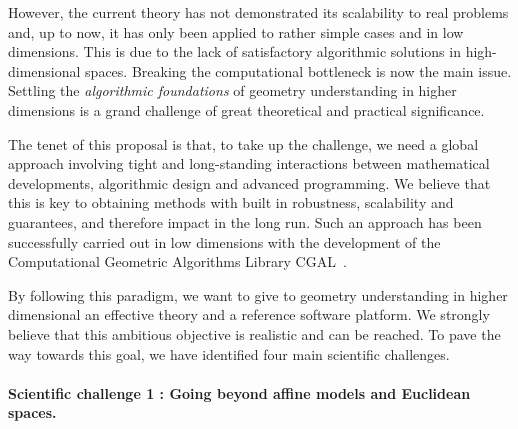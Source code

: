 

However, the current theory has not demonstrated its scalability to real problems and, up to now, it has only been applied to rather simple cases and in low dimensions. This is  due to the lack of satisfactory algorithmic solutions in high-dimensional spaces.
Breaking the computational bottleneck is now the main issue.  Settling the {\em algorithmic foundations} of geometry understanding in
higher dimensions
is a grand challenge of great theoretical and practical significance.


The tenet of this proposal is that, to take up the challenge, we need a global approach involving
tight and long-standing interactions between mathematical developments, algorithmic design and advanced programming. We believe that this is key to obtaining methods with built in
robustness, scalability and guarantees, and therefore  impact in the long run.
Such an approach has been successfully carried out in low dimensions with the 
development of the Computational Geometric Algorithms Library CGAL~\cite{cgal}. 

By following this paradigm, we want  to give to  geometry understanding in higher dimensional an effective theory and a reference software platform. 
We strongly believe that this ambitious objective is realistic and can be reached. To pave the way towards this goal, we have identified  four main scientific challenges.



\paragraph{Scientific challenge 1 :  Going beyond affine models and Euclidean spaces.}

